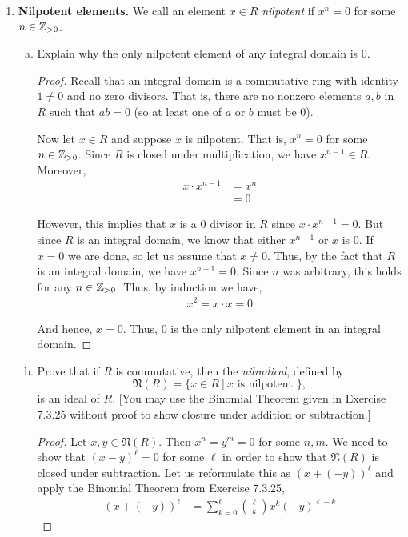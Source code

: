 \documentclass[11pt, reqno]{amsart}
\theoremstyle{plain}
\theoremstyle{definition}
\theoremstyle{example}
\def\fN{\mathfrak{N}}
\begin{document}
\begin{enumerate}[1.]
\item {\bf Nilpotent elements.} 
We call an element $x \in R$ \emph{nilpotent} if $x^n = 0$ for some $n \in \mathbb{Z}_{>0}$.  
\begin{enumerate}[(a)]
\item Explain why the only nilpotent element of any integral domain is $0$. 

\begin{proof}
Recall that an integral domain is a commutative ring with identity $1 \neq 0$ and no zero divisors. That is, there are no nonzero elements $a,b$ in $R$ such that $ab = 0$ (so at least one of $a$ or $b$ must be $0$).

\par
Now let $x \in R$ and suppose $x$ is nilpotent. That is, $x^n = 0$ for some $n \in \mathbb{Z}_{>0}$. Since $R$ is closed under multiplication, we have $x^{n-1} \in R$. Moreover, 
\begin{align*}
x \cdot x^{n-1} &= x^n\\
&= 0
\end{align*}

However, this implies that $x$ is a $0$ divisor in $R$ since $x \cdot x^{n-1} = 0$. But since $R$ is an integral domain, we know that either $x^{n-1}$ or $x$ is $0$. If $x = 0$ we are done, so let us assume that $x \neq 0$. Thus, by the fact that $R$ is an integral domain, we have $x^{n-1} = 0$. Since $n$ was arbitrary, this holds for any $n \in \mathbb{Z}_{>0}$. Thus, by induction we have,
\begin{align*}
x^2 = x \cdot x = 0
\end{align*}

And hence, $x = 0$. Thus, $0$ is the only nilpotent element in an integral domain.
\end{proof}

\item Prove that if $R$ is commutative, then the \emph{nilradical}, defined by 
$$\fN(R) = \{ x\in R ~|~ x \text{ is nilpotent }\},$$
is an ideal of $R$. {[You may use the Binomial Theorem given in Exercise 7.3.25 without proof to show closure under addition or subtraction.]}

\begin{proof}
Let $x, y \in \fN(R)$. Then $x^n = y^m = 0$ for some $n, m$. We need to show that $(x-y)^{\ell} = 0$ for some $\ell$ in order to show that $\fN(R)$ is closed under subtraction. Let us reformulate this as $(x + (-y))^{\ell}$ and apply the Binomial Theorem from Exercise 7.3.25,
\begin{align*}
(x + (-y))^{\ell} &= \sum_{k=0}^{\ell} {\ell \choose k} x^k (-y)^{\ell - k}
\end{align*}
\end{proof}


\end{enumerate}
\end{enumerate}
\end{document}
